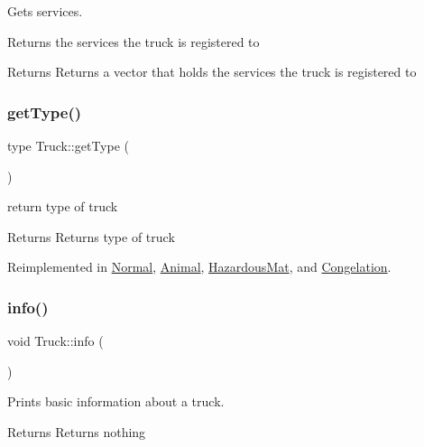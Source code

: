 Gets services. 

Returns the services the truck is registered to

\begin{DoxyReturn}{Returns}
Returns a vector that holds the services the truck is registered to 
\end{DoxyReturn}
\mbox{\label{class_truck_a24406caf4d09be7f3eff069ce6bc015b}} 
\subsubsection{\texorpdfstring{get\+Type()}{getType()}}
{\footnotesize\ttfamily type Truck\+::get\+Type (\begin{DoxyParamCaption}{ }\end{DoxyParamCaption})\hspace{0.3cm}{\ttfamily [virtual]}}



return type of truck 

\begin{DoxyReturn}{Returns}
Returns type of truck 
\end{DoxyReturn}


Reimplemented in \hyperlink{class_normal_ae34be8332ea67df5fb0ae9b274884748}{Normal}, \hyperlink{class_animal_a6e7f8a4a7e8e9571218e3650a0803c03}{Animal}, \hyperlink{class_hazardous_mat_aed587121cdff185be91ad9ec5ba4d380}{Hazardous\+Mat}, and \hyperlink{class_congelation_a5026bd6791faeae03fbf1ad84f9bbc08}{Congelation}.

\mbox{\label{class_truck_a38f09eab2822524e355ecf6d0a13f7de}} 
\subsubsection{\texorpdfstring{info()}{info()}}
{\footnotesize\ttfamily void Truck\+::info (\begin{DoxyParamCaption}{ }\end{DoxyParamCaption})\hspace{0.3cm}{\ttfamily [virtual]}}



Prints basic information about a truck. 

\begin{DoxyReturn}{Returns}
Returns nothing 
\end{DoxyReturn}


